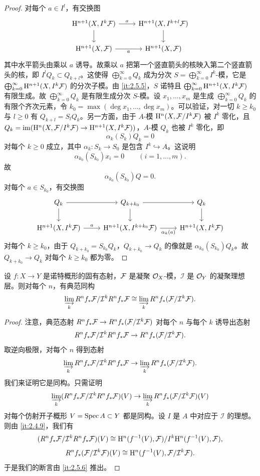 \begin{proof}
对每个 $a\in I^l$，有交换图
\[
\begin{tikzcd}
\HH^{n+1}(X,I^k\cF) \arrow[r,"a"] \arrow[d] & \HH^{n+1}(X,I^{k+l}\cF) \arrow[d] \\
\HH^{n+1}(X,\cF) \arrow[r,"a"'] & \HH^{n+1}(X,\cF)
\end{tikzcd}
\]
其中水平箭头由乘以 $a$ 诱导。故乘以 $a$ 把第一个竖直箭头的核映入第二个竖直箭头的核，即 $I^lQ_k\subset Q_{k+l}$。这使得 $\bigoplus_{k=0}^\infty Q_k$ 成为分次 $S=\bigoplus_{k=0}^\infty I^k$-模，它是 $\bigoplus_{k=0}^\infty\mathrm{H}^{n+1}(X,I^k\mathcal{F})$ 的分次子模。由 \ref{it:2.5.5}，$S$ 诺特且 $\bigoplus_{k=0}^\infty\mathrm{H}^{n+1}(X,I^k\mathcal{F})$ 有限生成。故 $\bigoplus_{k=0}^\infty Q_k$ 是有限生成分次 $S$-模。设 $x_1,\dots,x_m$ 是生成 $\bigoplus_{k=0}^\infty Q_k$ 的有限个齐次元素，令 $k_0=\max(\deg x_1,\dots,\deg x_m)$。可以验证，对一切 $k\ge k_0$ 与 $l\ge 0$ 有 $Q_{k+l}=S_lQ_k$。另一方面，由于 $A$-模 $\mathrm{H}^n(X,\mathcal{F}/I^k\mathcal{F})$ 被 $I^k$ 零化，且 $Q_k=\operatorname{im}(\mathrm{H}^n(X,\mathcal{F}/I^k\mathcal{F})\to\mathrm{H}^{n+1}(X,I^k\mathcal{F}))$，$A$-模 $Q_k$ 也被 $I^k$ 零化，即
\[
\alpha_k(S_k)Q_k=0
\]
对每个 $k\ge 0$ 成立，其中 $\alpha_k\colon S_k\to S_0$ 是包含 $I^k\hookrightarrow A$。这说明
\[
\alpha_{k_0}(S_{k_0})x_i=0\qquad(i=1,\dots,m).
\]
故
\[
\alpha_{k_0}(S_{k_0})Q=0.
\]
对每个 $a\in S_{k_0}$，有交换图
\[
\begin{tikzcd}
Q_k \arrow[r] \arrow[d] & Q_{k+k_0} \arrow[r] \arrow[d] & Q_k \arrow[d] \\
\HH^{n+1}(X,I^k\cF) \arrow[r,"a"] & \HH^{n+1}(X,I^{k+k_0}\cF) \arrow[r,"\alpha_k(a)"'] & \HH^{n+1}(X,I^k\cF)
\end{tikzcd}
\]
对每个 $k\ge k_0$，由于 $Q_{k+k_0}=S_{k_0}Q_k$，$Q_{k+k_0}\to Q_k$ 的像就是 $\alpha_{k_0}(S_{k_0})Q_k$。故 $Q_{k+k_0}\to Q_k$ 对每个 $k\ge k_0$ 都为零。
\end{proof}

\begin{corollary}\label{it:2.5.9}
设 $f\colon X\to Y$ 是诺特概形的固有态射，$\mathcal{F}$ 是凝聚 $\mathcal{O}_X$-模，$\mathcal{I}$ 是 $\mathcal{O}_Y$ 的凝聚理想层。则对每个 $n$，有典范同构
\[
\varinjlim_k R^nf_*\mathcal{F}/\mathcal{I}^kR^nf_*\mathcal{F}\cong\varinjlim_k R^nf_*(\mathcal{F}/\mathcal{I}^k\mathcal{F}).
\]
\end{corollary}
\begin{proof}
注意，典范态射 $R^nf_*\mathcal{F}\to R^nf_*(\mathcal{F}/\mathcal{I}^k\mathcal{F})$ 对每个 $n$ 与每个 $k$ 诱导出态射
\[
R^nf_*\mathcal{F}/\mathcal{I}^kR^nf_*\mathcal{F}\to R^nf_*(\mathcal{F}/\mathcal{I}^k\mathcal{F}).
\]
取逆向极限，对每个 $n$ 得到态射
\[
\varinjlim_k R^nf_*\mathcal{F}/\mathcal{I}^kR^nf_*\mathcal{F}\to\varinjlim_k R^nf_*(\mathcal{F}/\mathcal{I}^k\mathcal{F}).
\]
我们来证明它是同构。只需证明
\[
\varinjlim_k(R^nf_*\mathcal{F}/\mathcal{I}^kR^nf_*\mathcal{F})(V)\to\varinjlim_k R^nf_*(\mathcal{F}/\mathcal{I}^k\mathcal{F})(V)
\]
对每个仿射开子概形 $V=\operatorname{Spec} A\subset Y$ 都是同构。设 $I$ 是 $A$ 中对应于 $\mathcal{I}$ 的理想。则由 \ref{it:2.4.9}，我们有
\[
(R^nf_*\mathcal{F}/\mathcal{I}^kR^nf_*\mathcal{F})(V)\cong\mathrm{H}^n(f^{-1}(V),\mathcal{F})/I^k\mathrm{H}^n(f^{-1}(V),\mathcal{F}),
\]
\[
R^nf_*(\mathcal{F}/\mathcal{I}^k\mathcal{F})(V)\cong\mathrm{H}^n(f^{-1}(V),\mathcal{F}/\mathcal{I}^k\mathcal{F}).
\]
于是我们的断言由 \ref{it:2.5.6} 推出。
\end{proof}

